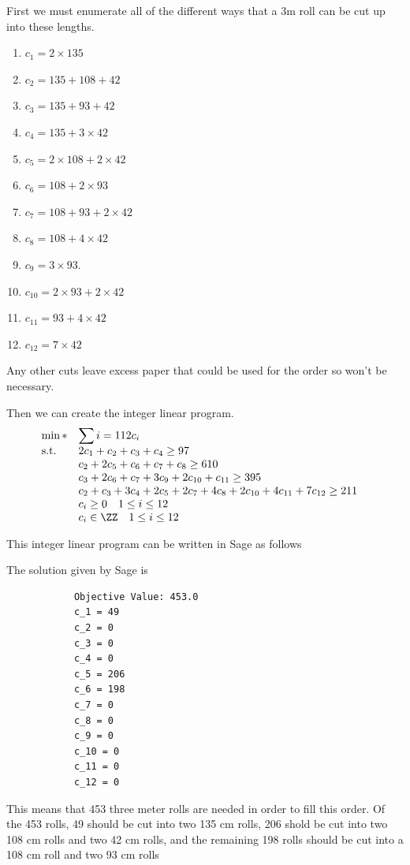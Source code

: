 \documentclass[11pt, oneside]{article}
\begin{document}
\begin{enumerate}
        First we must enumerate all of the different ways that a 3m roll can be
        cut up into these lengths.
        \begin{enumerate}
            \item $c_1 = 2 \times 135$
            \item $c_2 = 135 + 108 + 42$
            \item $c_3 = 135 + 93 + 42$
            \item $c_4 = 135 + 3 \times 42$
            \item $c_5 = 2 \times 108 + 2 \times 42$
            \item $c_6 = 108 + 2 \times 93$
            \item $c_7 = 108 + 93 + 2 \times 42$
            \item $c_8 = 108 + 4 \times 42$
            \item $c_9 = 3 \times 93$.
            \item $c_{10} = 2 \times 93 + 2 \times 42$
            \item $c_{11} = 93 + 4 \times 42$
            \item $c_{12} = 7 \times 42$
        \end{enumerate}
        Any other cuts leave excess paper that could be used for the order so
        won't be necessary.

        Then we can create the integer linear program.
        \[
            \begin{array}{ll@{}ll}
                \min* & \displaystyle\sum{i = 1}{12}{c_i} & & \\
                \text{s.t.} & 2c_1 + c_2 + c_3 + c_4 \ge 97 \\
                & c_2 + 2c_5 + c_6 + c_7 + c_8 \ge 610 \\
                & c_3 + 2 c_6 + c_7 + 3c_9 + 2c_{10} + c_{11} \ge 395 \\
                & c_2 + c_3 + 3c_4 + 2c_5 + 2c_7 + 4c_8 + 2c_{10} + 4c_{11} + 7c_{12} \ge 211 \\
                & c_i \ge 0 \quad 1 \le i \le 12 \\
                & c_i \in \ZZ \quad 1 \le i \le 12
            \end{array}
        \]

        This integer linear program can be written in Sage as follows
        

        The solution given by Sage is
        \begin{verbatim}
            Objective Value: 453.0
            c_1 = 49
            c_2 = 0
            c_3 = 0
            c_4 = 0
            c_5 = 206
            c_6 = 198
            c_7 = 0
            c_8 = 0
            c_9 = 0
            c_10 = 0
            c_11 = 0
            c_12 = 0
        \end{verbatim}

        This means that 453 three meter rolls are needed in order to fill this order.
        Of the 453 rolls, 49 should be cut into two 135 cm rolls, 206 shold be
        cut into two 108 cm rolls and two 42 cm rolls, and the remaining 198
        rolls should be cut into a 108 cm roll and two 93 cm rolls
\end{enumerate}
\end{document}
